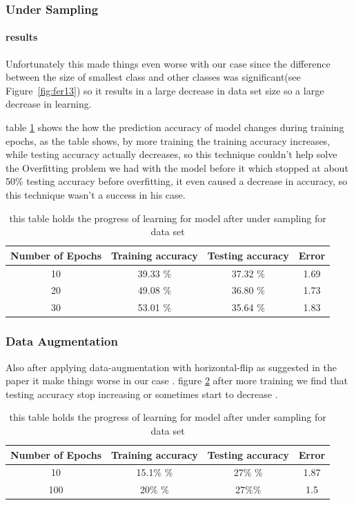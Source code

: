 \subsubsection{Under Sampling}
\paragraph{results}
Unfortunately this made things even worse with our case since the difference between the size of smallest class and other classes was significant(see Figure~\ref{fig:fer13}) so it results in a large decrease in data set size so a large decrease in learning. \newline

table \ref{tab:table1} shows the how the prediction accuracy of model changes during training epochs, as the table shows, by more training the training accuracy increases, while testing accuracy actually decreases, so this technique couldn't help solve the Overfitting problem we had with the model before it which stopped at about 50\% testing accuracy before overfitting, it even caused a decrease in accuracy, so this technique wasn't a success in his case. 
\begin{table}[h!]
	\centering
	\caption{this table holds the progress of learning for model after under sampling for data set}
	\label{tab:table1}
	\begin{tabular}{c | c | c | c}
		\textbf{Number of Epochs} & \textbf{Training accuracy} & \textbf{Testing accuracy} & \textbf{Error}\\ \hline 
		10 & 39.33 \% & 37.32 \% & 1.69 \\
		20 & 49.08 \% & 36.80 \% & 1.73 \\
		30 & 53.01 \% & 35.64 \% & 1.83 \\
	\end{tabular}
\end{table}

\subsubsection{Data Augmentation}
Also after applying data-augmentation with horizontal-flip as suggested in the paper\cite{state_of_art}
it make things worse in our case .
figure \ref{tab:table12} after more training we find that testing accuracy stop increasing or sometimes start to decrease .
\begin{table}[h!]
	\centering
	\caption{this table holds the progress of learning for model after under sampling for data set}
	\label{tab:table12}
	\begin{tabular}{c | c | c | c}
		\textbf{Number of Epochs} & \textbf{Training accuracy} & \textbf{Testing accuracy} & \textbf{Error}\\ \hline 
		10 & 15.1\% \% & 27\% \% & 1.87 \\
		100 & 20\% \% &  27\%\% & 1.5 \\
	\end{tabular}
\end{table}
